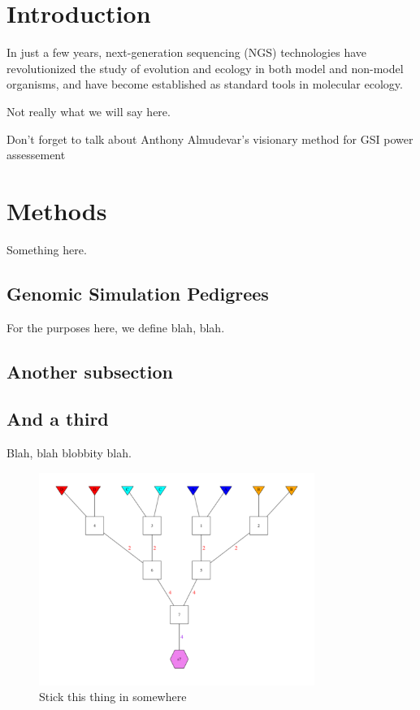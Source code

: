 
\section*{Introduction}

In just a few years, next-generation sequencing (NGS) technologies have revolutionized the study of evolution and ecology in both model and non-model organisms, and have become established as standard tools in molecular ecology.

Not really what we will say here.

Don't forget to talk about Anthony Almudevar's visionary method for GSI power assessement \citep{almudevar2000exact}


\section*{Methods}

Something here.

\subsection*{Genomic Simulation Pedigrees}

For the purposes here, we define blah, blah.

\subsection*{Another subsection}



\subsection*{And a third}

Blah, blah blobbity blah.


\begin{figure}
\begin{center}
\includegraphics[width=0.8\textwidth]{images/gsp4-700.pdf}
\end{center}
\caption[]{Stick this thing in somewhere}
\end{figure}


